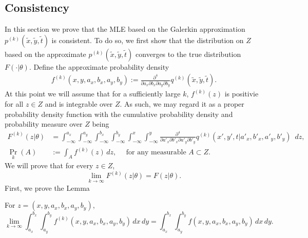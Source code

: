 \subsection{Consistency}
In this section we prove that the MLE based on the Galerkin
approximation $p^{(k)}(\tilde{x},\tilde{y},\tilde{t})$ is
consistent. To do so, we first show that the distribution on $Z$ based
on the approximate $p^{(k)}(\tilde{x},\tilde{y},\tilde{t})$ converges
to the true distribution $F(\cdot | \theta)$. Define the approximate probability
density
\begin{align}
  f^{(k)}(x,y,a_x,b_x,a_y,b_y) := \frac{\partial^4}{\partial
  a_x \partial b_x \partial a_y \partial b_y}
  q^{(k)}(\tilde{x},\tilde{y},\tilde{t}). \label{eq:galerkin-density}
\end{align}
At this point we will assume that for a sufficiently large $k$,
$f^{(k)}(z)$ is positivie for all $z \in Z$ and is integrable over
$Z$. As such, we may regard it as a proper probability density
function with the cumulative probability density and probability
measure over $Z$ being 
\begin{align}
  F^{(k)}(z | \theta) &= \displaystyle \int_{-\infty}^{a_x} \displaystyle \int_{-\infty}^{a_y} \displaystyle \int_{-\infty}^{b_x} \displaystyle \int_{-\infty}^{b_y} \displaystyle \int_{-\infty}^x \displaystyle \int_{-\infty}^y \frac{\partial^4}{\partial a'_x \partial b'_x \partial a'_y \partial b'_y} q^{(k)}(x', y', t | a'_x, b'_x, a'_y, b'_y)\,\,\, dz, \label{eq:approx-measure} \\
                          \Pr_{k}(A) &:= \displaystyle \int_{A} f^{(k)}(z)\, dz, \quad \mbox{ for any measurable } A \subset Z. \label{eq:approx-measure-2}
\end{align}
We will prove that for every $z \in Z$,
\[
  \lim_{k\to \infty} F^{(k)}(z | \theta) = F(z | \theta).
\]
First, we prove the Lemma
\begin{lemma}\label{lem:1}
  For $z = (x, y, a_x, b_x, a_y, b_y)$,
  \[
    \lim_{k\to \infty} \displaystyle \int_{a_x}^{b_x} \displaystyle
    \int_{a_y}^{b_y} f^{(k)}(x,y,a_x,b_x,a_y,b_y)\, dx\,dy =
    \displaystyle \int_{a_x}^{b_x} \displaystyle \int_{a_y}^{b_y}
    f(x,y,a_x,b_x,a_y,b_y)\, dx\,dy.
  \]
\end{lemma}
